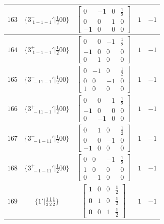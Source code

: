 \documentclass[fleqn,8pt]{jsarticle}
\begin{document}
\begin{longtable}{ccccc}
$ 163 $ & $ \{3^{-}_{\,\,1-1-1}{}'|\frac{1}{2} 0 0\} $ & $ \begin{bmatrix} 0 & -1 & 0 & \frac{1}{2} \\ 0 & 0 & 1 & 0 \\ -1 & 0 & 0 & 0 \end{bmatrix} $ & $ 1 $ & $ -1 $ \\ \hline
$ 164 $ & $ \{3^{+}_{\,\,1-1-1}{}'|\frac{1}{2} 0 0\} $ & $ \begin{bmatrix} 0 & 0 & -1 & \frac{1}{2} \\ -1 & 0 & 0 & 0 \\ 0 & 1 & 0 & 0 \end{bmatrix} $ & $ 1 $ & $ -1 $ \\ \hline
$ 165 $ & $ \{3^{-}_{\,\,-11-1}{}'|\frac{1}{2} 0 0\} $ & $ \begin{bmatrix} 0 & -1 & 0 & \frac{1}{2} \\ 0 & 0 & -1 & 0 \\ 1 & 0 & 0 & 0 \end{bmatrix} $ & $ 1 $ & $ -1 $ \\ \hline
$ 166 $ & $ \{3^{+}_{\,\,-11-1}{}'|\frac{1}{2} 0 0\} $ & $ \begin{bmatrix} 0 & 0 & 1 & \frac{1}{2} \\ -1 & 0 & 0 & 0 \\ 0 & -1 & 0 & 0 \end{bmatrix} $ & $ 1 $ & $ -1 $ \\ \hline
$ 167 $ & $ \{3^{-}_{\,\,-1-11}{}'|\frac{1}{2} 0 0\} $ & $ \begin{bmatrix} 0 & 1 & 0 & \frac{1}{2} \\ 0 & 0 & -1 & 0 \\ -1 & 0 & 0 & 0 \end{bmatrix} $ & $ 1 $ & $ -1 $ \\ \hline
$ 168 $ & $ \{3^{+}_{\,\,-1-11}{}'|\frac{1}{2} 0 0\} $ & $ \begin{bmatrix} 0 & 0 & -1 & \frac{1}{2} \\ 1 & 0 & 0 & 0 \\ 0 & -1 & 0 & 0 \end{bmatrix} $ & $ 1 $ & $ -1 $ \\ \hline
$ 169 $ & $ \{1{}'|\frac{1}{2} \frac{1}{2} \frac{1}{2}\} $ & $ \begin{bmatrix} 1 & 0 & 0 & \frac{1}{2} \\ 0 & 1 & 0 & \frac{1}{2} \\ 0 & 0 & 1 & \frac{1}{2} \end{bmatrix} $ & $ 1 $ & $ -1 $ \\ \hline

\end{longtable}
\end{document}
